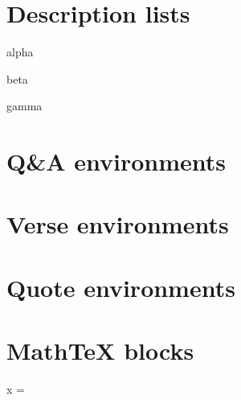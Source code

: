 \section{Description lists}

\p{\lorem}
\begin{description}
\item{alpha} \p{\lorem}
\item{beta} \p{\lorem}
\item{gamma} \p{\lorem}
\end{description}
\p{\lorem}

\section{Q&A environments}

\p{\lorem}
\begin{qanda}
    \p{\short}
    \p{\lorem}
    \p{\short}
    \p{\lorem}
    \p{\lorem}
\rquestion
    \p{\lorem}
\ranswer
    \p{\lorem}
\question
    \p{\lorem}
\answer
    \p{\lorem}
    \p{\lorem}
\rquestion
    \p{\lorem}
\ranswer
    \p{\lorem}
\end{qanda}
\p{\lorem}


\section{Verse environments}

\p{\lorem}
\begin{verse}
\p{\fox \br \fox \br \fox \br \fox}
\p{\fox \br \fox \br \fox \br \fox}
\p{\fox \br \fox \br \fox \br \fox}
\end{verse}
\p{\lorem}


\section{Quote environments}

\p{\lorem}
\begin{quote}
\p{\lorem}
\end{quote}
\p{\lorem}


\section{MathTeX blocks}

\p{\lorem}
\begin{mathtex}
x = 
\end{mathtex}
\p{\lorem}


